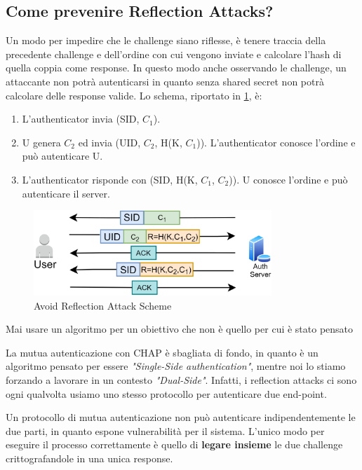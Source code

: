 \subsection{Come prevenire Reflection Attacks?}
Un modo per impedire che le challenge siano riflesse, è tenere traccia della precedente challenge e dell'ordine con cui vengono inviate e calcolare l'hash di quella coppia come response. In questo modo anche osservando le challenge, un attaccante non potrà autenticarsi in quanto senza shared secret non potrà calcolare delle response valide. Lo schema, riportato in \cref{fig:reflectionavoid}, è:
\begin{enumerate}
    \item L'authenticator invia (SID, $C_1$).
    \item U genera $C_2$ ed invia (UID, $C_2$, H(K, $C_1$)). L'authenticator conosce l'ordine e può autenticare U.
    \item L'authenticator risponde con (SID, H(K, $C_1$, $C_2$)). U conosce l'ordine e può autenticare il server.
\end{enumerate}
\begin{figure}[ht]
    \centering
    \includegraphics[width=0.8\textwidth]{image/reflectionavoid.png}
    \caption{Avoid Reflection Attack Scheme}
    \label{fig:reflectionavoid}
\end{figure}
\begin{corollary}
Mai usare un algoritmo per un obiettivo che non è quello per cui è stato pensato
\end{corollary}
La mutua autenticazione con CHAP è sbagliata di fondo, in quanto è un algoritmo pensato per essere \textit{"Single-Side authentication"}, mentre noi lo stiamo forzando a lavorare in un contesto \textit{"Dual-Side"}. Infatti, i reflection attacks ci sono ogni qualvolta usiamo uno stesso protocollo per autenticare due end-point. 
\begin{note}
Un protocollo di mutua autenticazione non può autenticare indipendentemente le due parti, in quanto espone vulnerabilità per il sistema. L'unico modo per eseguire il processo correttamente è quello di \textbf{legare insieme} le due challenge crittografandole in una unica response.
\end{note}
